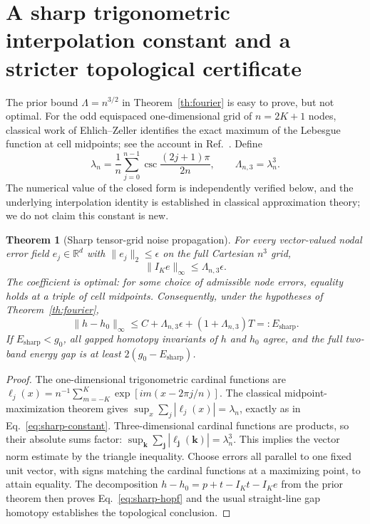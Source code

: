 \documentclass[aps,prd,onecolumn,notitlepage,11pt,superscriptaddress,longbibliography]{revtex4-2}
\newtheorem{theorem}{Theorem}
\begin{document}
\section{A sharp trigonometric interpolation constant and a stricter topological certificate}
The prior bound $\Lambda=n^{3/2}$ in Theorem~\ref{th:fourier}
is easy to prove, but not optimal. For the odd equispaced
one-dimensional grid of $n=2K+1$ nodes, classical work of
Ehlich--Zeller identifies the exact maximum of the Lebesgue function
at cell midpoints; see the account in Ref.~\cite{SorevikNome2015}.
Define
\begin{equation}
\lambda_n=\frac1n\sum_{j=0}^{n-1}\csc\frac{(2j+1)\pi}{2n},\qquad
\Lambda_{n,3}=\lambda_n^3.
\label{eq:sharp-constant}
\end{equation}
The numerical value of the closed form is independently verified
below, and the underlying interpolation identity is established in
classical approximation theory; we do not claim this constant is new.

\begin{theorem}[Sharp tensor-grid noise propagation]
For every vector-valued nodal error field $e_j\in\mathbb R^d$
with $\|e_j\|_2\le\epsilon$ on the full Cartesian $n^3$ grid,
\begin{equation}
\boxed{\|I_K e\|_\infty\le\Lambda_{n,3}\epsilon.}
\end{equation}
The coefficient is \emph{optimal}: for some choice of admissible
node errors, equality holds at a triple of cell midpoints.
Consequently, under the hypotheses of Theorem~\ref{th:fourier},
\begin{equation}
\boxed{\|h-h_0\|_\infty\le C+\Lambda_{n,3}\epsilon+
(1+\Lambda_{n,3})T=:E_\mathrm{sharp}.}
\label{eq:sharp-hopf}
\end{equation}
If $E_\mathrm{sharp}<g_0$, all gapped homotopy invariants of $h$
and $h_0$ agree, and the full two-band energy gap is at least
$2(g_0-E_\mathrm{sharp})$.
\end{theorem}
\begin{proof}
The one-dimensional trigonometric cardinal functions are
$\ell_j(x)=n^{-1}\sum_{m=-K}^{K}\exp[im(x-2\pi j/n)]$.
The classical midpoint-maximization theorem gives
$\sup_x\sum_j|\ell_j(x)|=\lambda_n$, exactly as in
Eq.~\eqref{eq:sharp-constant}. Three-dimensional cardinal functions
are products, so their absolute sums factor:
$\sup_{\bm k}\sum_{\bm j}|\ell_{\bm j}(\bm k)|=\lambda_n^3$.
This implies the vector norm estimate by the triangle inequality.
Choose errors all parallel to one fixed unit vector, with signs
matching the cardinal functions at a maximizing point, to attain
equality. The decomposition $h-h_0=p+t-I_Kt-I_Ke$ from the prior
theorem then proves Eq.~\eqref{eq:sharp-hopf} and the usual
straight-line gap homotopy establishes the topological conclusion.
\end{proof}
\end{document}
